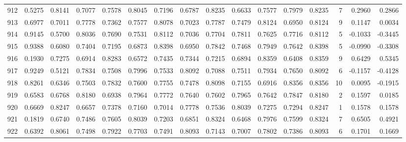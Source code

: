 \begin{tabular}{lrrrrrrrrrrrrrrr}
912 &      0.5275 &  0.8141 &  0.7077 &  0.7578 &  0.8045 &  0.7196 &  0.6787 &  0.8235 &  0.6633 &  0.7577 &   0.7979 &     0.8235 &      7 &                    0.2960 &                     0.2866 \\
913 &      0.6977 &  0.7011 &  0.7778 &  0.7362 &  0.7577 &  0.8078 &  0.7023 &  0.7787 &  0.7479 &  0.8124 &   0.6950 &     0.8124 &      9 &                    0.1147 &                     0.0034 \\
914 &      0.9145 &  0.5700 &  0.8036 &  0.7690 &  0.7531 &  0.8112 &  0.7036 &  0.7704 &  0.7811 &  0.7625 &   0.7716 &     0.8112 &      5 &                   -0.1033 &                    -0.3445 \\
915 &      0.9388 &  0.6080 &  0.7404 &  0.7195 &  0.6873 &  0.8398 &  0.6950 &  0.7842 &  0.7468 &  0.7949 &   0.7642 &     0.8398 &      5 &                   -0.0990 &                    -0.3308 \\
916 &      0.1930 &  0.7275 &  0.6914 &  0.8283 &  0.6572 &  0.7435 &  0.7344 &  0.7215 &  0.6894 &  0.8359 &   0.6408 &     0.8359 &      9 &                    0.6429 &                     0.5345 \\
917 &      0.9249 &  0.5121 &  0.7834 &  0.7508 &  0.7996 &  0.7533 &  0.8092 &  0.7088 &  0.7511 &  0.7934 &   0.7650 &     0.8092 &      6 &                   -0.1157 &                    -0.4128 \\
918 &      0.8261 &  0.6346 &  0.7503 &  0.7832 &  0.7600 &  0.7755 &  0.7478 &  0.8098 &  0.7155 &  0.6916 &   0.8356 &     0.8356 &     10 &                    0.0095 &                    -0.1915 \\
919 &      0.6583 &  0.6768 &  0.8180 &  0.6938 &  0.7964 &  0.7772 &  0.7640 &  0.7602 &  0.7965 &  0.7642 &   0.7847 &     0.8180 &      2 &                    0.1597 &                     0.0185 \\
920 &      0.6669 &  0.8247 &  0.6657 &  0.7378 &  0.7160 &  0.7014 &  0.7778 &  0.7536 &  0.8039 &  0.7275 &   0.7294 &     0.8247 &      1 &                    0.1578 &                     0.1578 \\
921 &      0.1819 &  0.6740 &  0.7486 &  0.7605 &  0.8039 &  0.7203 &  0.6851 &  0.8324 &  0.6468 &  0.7976 &   0.7599 &     0.8324 &      7 &                    0.6505 &                     0.4921 \\
922 &      0.6392 &  0.8061 &  0.7498 &  0.7922 &  0.7703 &  0.7491 &  0.8093 &  0.7143 &  0.7007 &  0.7802 &   0.7386 &     0.8093 &      6 &                    0.1701 &                     0.1669 \\

\end{tabular}
